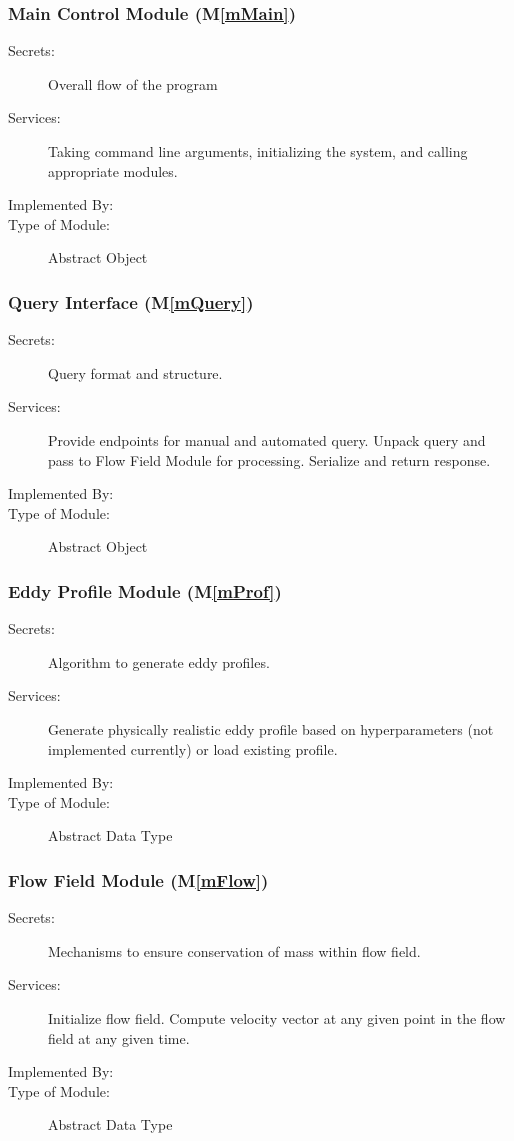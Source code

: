 \documentclass[12pt, titlepage]{article}
\newcommand{\mref}[1]{M\ref{#1}}
\begin{document}
\subsubsection{Main Control Module (\mref{mMain})}
\begin{description}
\item[Secrets:]Overall flow of the program
\item[Services:]Taking command line arguments, initializing the system, and calling appropriate modules.
\item[Implemented By:] \progname{}
\item[Type of Module:] Abstract Object
\end{description}

\subsubsection{Query Interface (\mref{mQuery})}
\begin{description}
\item[Secrets:]Query format and structure.
\item[Services:]Provide endpoints for manual and automated query. Unpack query and pass to Flow Field Module for processing. Serialize and return response.
\item[Implemented By:] \progname{}
\item[Type of Module:] Abstract Object
\end{description}

\subsubsection{Eddy Profile Module (\mref{mProf})}
\begin{description}
\item[Secrets:]Algorithm to generate eddy profiles.
\item[Services:]Generate physically realistic eddy profile based on hyperparameters (not implemented currently) or load existing profile.
\item[Implemented By:] \progname{}
\item[Type of Module:] Abstract Data Type
\end{description}

\subsubsection{Flow Field Module (\mref{mFlow})}
\begin{description}
\item[Secrets:]Mechanisms to ensure conservation of mass within flow field.
\item[Services:]Initialize flow field. Compute velocity vector at any given point in the flow field at any given time.
\item[Implemented By:] \progname{}
\item[Type of Module:] Abstract Data Type
\end{description}
\end{document}
